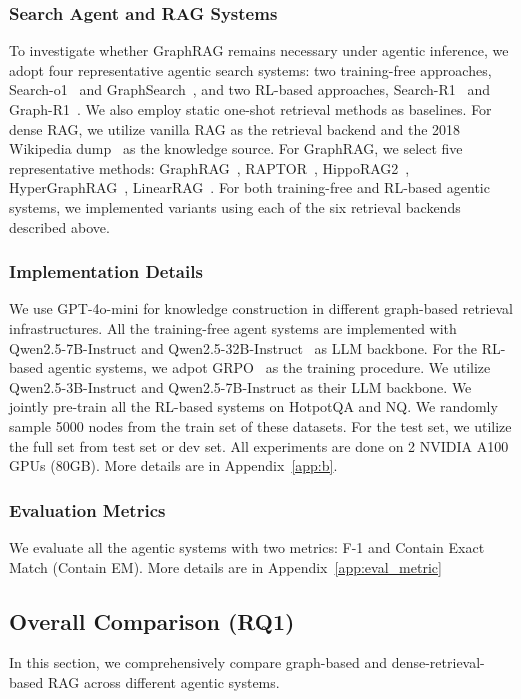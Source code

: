 \subsubsection{\textbf{Search Agent and RAG Systems}}
To investigate whether GraphRAG remains necessary under agentic inference, we adopt four representative agentic search systems: two training-free approaches, Search-o1~\cite{li2025searcho1} and GraphSearch~\cite{yang2025graphsearch}, and two RL-based approaches, Search-R1~\cite{jin2025searchr1} and Graph-R1~\cite{luo2025graphr1}. We also employ static one-shot retrieval methods as baselines. For dense RAG, we utilize vanilla RAG as the retrieval backend and the 2018 Wikipedia dump~\cite{wikidump} as the knowledge source. For GraphRAG, we select five representative methods: GraphRAG~\cite{edge2024local}, RAPTOR~\cite{sarthi2024raptor}, HippoRAG2~\cite{gutiérrez2025hipporag2}, HyperGraphRAG~\cite{luo2025hypergraphrag}, LinearRAG~\cite{zhuang2025linearrag}. For both training-free and RL-based agentic systems, we implemented variants using each of the six retrieval backends described above.

\subsubsection{\textbf{Implementation Details}}
We use GPT-4o-mini for knowledge construction in different graph-based retrieval infrastructures. All the training-free agent systems are implemented with Qwen2.5-7B-Instruct and Qwen2.5-32B-Instruct~\cite{qwen2025qwen25technicalreport} as LLM backbone. For the RL-based agentic systems, we adpot GRPO~\cite{shao2024grpo} as the training procedure. We utilize Qwen2.5-3B-Instruct and Qwen2.5-7B-Instruct as their LLM backbone. We jointly pre-train all the RL-based systems on HotpotQA and NQ. We randomly sample 5000 nodes from the train set of these datasets. For the test set, we utilize the full set from test set or dev set.  All experiments are done on 2 NVIDIA A100 GPUs (80GB). More details are in Appendix~\ref{app:b}.

\subsubsection{\textbf{Evaluation Metrics}}
We evaluate all the agentic systems with two metrics: F-1 and Contain Exact Match (Contain EM). More details are in Appendix~\ref{app:eval_metric}

\subsection{Overall Comparison (RQ1)}
In this section, we comprehensively compare graph-based and dense-retrieval-based RAG across different agentic systems. 
